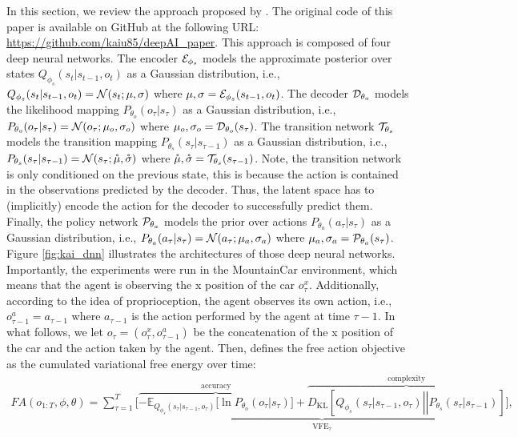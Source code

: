 \documentclass[twoside,11pt]{article}
\let\oldmathcal\mathcal
\renewcommand{\mathcal}[1]{%
  \IfSubStr{ABCDEFGHIJKLMNOPQRSTUVWXYZ}{#1}{\oldmathcal{#1}}{\mathdutchcal{#1}}
}
\newcommand{\kl}[2]{D_{\mathrm{KL}} \left[ \left. \left. #1 \right|\right| #2 \right] }
\begin{document}
In this section, we review the approach proposed by \citet{DAI_Kai}. The original code of this paper is available on GitHub at the following URL: \url{https://github.com/kaiu85/deepAI_paper}. This approach is composed of four deep neural networks. The encoder $\mathcal{E}_{\phi_s}$ models the approximate posterior over states $Q_{\phi_s}(s_t|s_{t-1}, o_t)$ as a Gaussian distribution, i.e., $Q_{\phi_s}(s_t|s_{t-1}, o_t) = \mathcal{N}(s_t;\mu, \sigma)$ where $\mu, \sigma = \mathcal{E}_{\phi_s}(s_{t-1}, o_t)$. The decoder $\mathcal{D}_{\theta_o}$ models the likelihood mapping $P_{\theta_o}(o_\tau|s_\tau)$ as a Gaussian distribution, i.e., $P_{\theta_o}(o_\tau|s_\tau) = \mathcal{N}(o_\tau;\mu_o, \sigma_o)$ where $\mu_o, \sigma_o = \mathcal{D}_{\theta_o}(s_\tau)$. The transition network $\mathcal{T}_{\theta_s}$ models the transition mapping $P_{\theta_s}(s_\tau|s_{\tau-1})$ as a Gaussian distribution, i.e., $P_{\theta_s}(s_\tau|s_{\tau-1}) = \mathcal{N}(s_\tau;\mathring{\mu}, \mathring{\sigma})$ where $\mathring{\mu}, \mathring{\sigma} = \mathcal{T}_{\theta_s}(s_{\tau-1})$. Note, the transition network is only conditioned on the previous state, this is because the action is contained in the observations predicted by the decoder. Thus, the latent space has to (implicitly) encode the action for the decoder to successfully predict them. Finally, the policy network $\mathcal{P}_{\theta_a}$ models the prior over actions $P_{\theta_a}(a_\tau|s_\tau)$ as a Gaussian distribution, i.e., $P_{\theta_a}(a_\tau|s_\tau) = \mathcal{N}(a_\tau;\mu_a, \sigma_a)$ where $\mu_a, \sigma_a = \mathcal{P}_{\theta_a}(s_\tau)$. Figure \ref{fig:kai_dnn} illustrates the architectures of those deep neural networks. Importantly, the experiments were run in the MountainCar environment, which means that the agent is observing the x position of the car $o_\tau^x$. Additionally, according to the idea of proprioception, the agent observes its own action, i.e., $o^a_{\tau-1} = a_{\tau-1}$ where $a_{\tau-1}$ is the action performed by the agent at time $\tau-1$. In what follows, we let $o_\tau = (o^x_\tau, o^a_{\tau-1})$ be the concatenation of the x position of the car and the action taken by the agent. Then, \citet{DAI_Kai} defines the free action objective as the cumulated variational free energy over time:
\begin{align*}
FA(o_{1:T}, \phi, \theta) = \sum_{\tau = 1}^T \Bigg[\underbrace{\overbrace{- \mathbb{E}_{Q_{\phi_s}(s_\tau|s_{\tau-1}, o_\tau)}\Big[\ln P_{\theta_o}(o_\tau|s_\tau)\Big]}^{\text{accuracy}} + \overbrace{\kl{Q_{\phi_s}(s_\tau|s_{\tau-1}, o_\tau)}{P_{\theta_s}(s_\tau|s_{\tau-1})}}^{\text{complexity}} }_{\text{VFE}_\tau}\Bigg],
\end{align*}
\end{document}
